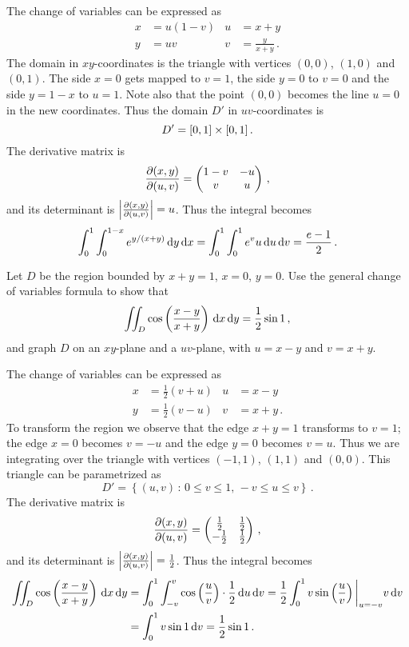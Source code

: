 \begin{solution}
The change of variables can be expressed as
\begin{align*}
x &= u(1-v) & u &= x+y \\
y &= uv & v &= \frac{y}{x+y}\,.
\end{align*}
The domain in $xy$-coordinates is the triangle with vertices $(0,0)$, $(1,0)$ and $(0,1)$. The side $x=0$ gets mapped to $v=1$, the side $y=0$ to $v=0$ and the side $y=1-x$ to $u=1$. Note also that the point $(0,0)$ becomes the line $u=0$ in the new coordinates. Thus the domain $D'$ in $uv$-coordinates is
\[
D' = [0,1] \times [0,1]\,.
\]
The derivative matrix is
\[
\frac{\partial(x,y)}{\partial(u,v)} = \begin{pmatrix}
1-v & -u \\ v & u
\end{pmatrix}\,,
\]
and its determinant is $\left| \frac{\partial(x,y)}{\partial(u,v)} \right| = u$. Thus the integral becomes
\[
\int_0^1 \int_0^{1-x} e^{y/(x+y)} \,\mathrm{d} y \,\mathrm{d} x = 
\int_0^1 \int_0^1 e^v u \,\mathrm{d} u \,\mathrm{d} v = \frac{e-1}{2}\,.
\]
\end{solution}

\begin{question}
Let $D$ be the region bounded by $x+y=1$, $x=0$, $y=0$. Use the general change of variables formula to show that
\[
\iint_D \cos\left(\frac{x-y}{x+y}\right) \,\mathrm{d} x \,\mathrm{d} y = \frac 12 \sin 1\,,
\]
and graph $D$ on an $xy$-plane and a $uv$-plane, with $u=x-y$ and $v=x+y$.
\end{question}

\begin{solution}
The change of variables can be expressed as
\begin{align*}
x &= \frac 12(v+u) & u &= x-y \\
y &= \frac 12(v-u) & v &= x+y\,.
\end{align*}
To transform the region we observe that the edge $x+y=1$ transforms to $v=1$; the edge $x=0$ becomes $v=-u$ and the edge $y=0$ becomes $v=u$. Thus we are integrating over the triangle with vertices $(-1,1)$, $(1,1)$ and $(0,0)$. This triangle can be parametrized as
\[
D' = \left\{ (u,v) \,:\, 0 \leq v \leq 1,\, -v \leq u \leq v \right\}\,.
\]
The derivative matrix is
\[
\frac{\partial(x,y)}{\partial(u,v)} = \begin{pmatrix}
\frac 12  & \frac 12 \\
-\frac 12 & \frac 12
\end{pmatrix}\,,
\]
and its determinant is $\left| \frac{\partial(x,y)}{\partial(u,v)} \right| = \frac 12$. Thus the integral becomes
\begin{align*}
\iint_D \cos\left(\frac{x-y}{x+y}\right) \,\mathrm{d} x \,\mathrm{d} y &= 
\int_0^1 \int_{-v}^v \cos\left(\frac uv\right) \cdot \frac 12 \,\mathrm{d} u \,\mathrm{d} v
= \frac 12 \int_0^1 v \sin\left(\frac uv\right) \bigg|_{u=-v}{v} \,\mathrm{d} v \\
&= \int_0^1 v \sin 1 \,\mathrm{d} v = \frac 12 \sin 1\,.
\end{align*}
\end{solution}

